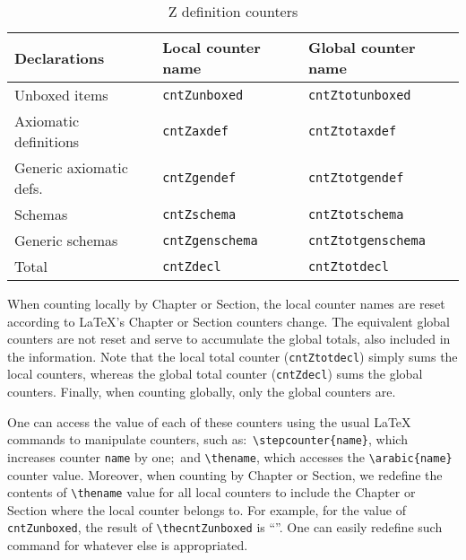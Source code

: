\documentclass{article}
\begin{document}
\begin{table}[ht]
    \centering
    \begin{tabular}{|l|l|l|}
        \hline
        \textbf{Declarations}   & \textbf{Local counter name}    & \textbf{Global counter name} \\
        \hline
        Unboxed items           & \texttt{cntZunboxed}           & \texttt{cntZtotunboxed} \\
        \hline
        Axiomatic definitions   & \texttt{cntZaxdef}             & \texttt{cntZtotaxdef} \\
        \hline
        Generic axiomatic defs. & \texttt{cntZgendef}            & \texttt{cntZtotgendef} \\
        \hline
        Schemas                 & \texttt{cntZschema}            & \texttt{cntZtotschema} \\
        \hline
        Generic schemas         & \texttt{cntZgenschema}         & \texttt{cntZtotgenschema} \\
        \hline
        Total                   & \texttt{cntZdecl}              & \texttt{cntZtotdecl} \\
        \hline
    \end{tabular}
    \caption{Z definition counters}\label{tbl:cztcount}
\end{table}
%
When counting locally by Chapter or Section, the local counter names are reset according
to \LaTeX's Chapter or Section counters change. The equivalent global counters are not
reset and serve to accumulate the global totals, also included in the information. Note
that the local total counter (\texttt{cntZtotdecl}) simply sums the local counters, whereas
the global total counter (\texttt{cntZdecl}) sums the global counters. Finally, when
counting globally, only the global counters are.

One can access the value of each of these counters using the usual \LaTeX{} commands
to manipulate counters, such as:~\verb|\stepcounter{name}|, which increases counter
\texttt{name} by one;~and \verb|\thename|, which accesses the \verb|\arabic{name}| counter value.
Moreover, when counting by Chapter or Section, we redefine the contents of \verb|\thename| value
for all local counters to include the Chapter or Section where the local counter belongs to. For
example, for the value of \texttt{cntZunboxed}, the result of \verb|\thecntZunboxed| is
``\thecntZunboxed''. One can easily redefine such command for whatever else is
appropriated.
\end{document}
